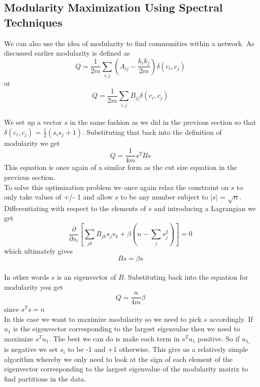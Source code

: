 \documentclass[12pt]{article}
\begin{document}
	\subsection{Modularity Maximization Using Spectral Techniques} 
	We can also use the idea of modularity to find communities within a network. As discussed earlier modularity is defined as 
	\begin{equation}
		Q = \frac{1}{2m} \sum_{i,j} \left( A_{ij} - \frac{k_i k_j}{2m} \right) \delta (c_i,c_j)
	\end{equation}
	or
	\begin{equation}
		Q = \frac{1}{2m} \sum_{i,j} B_{ij} \delta (c_i,c_j)
	\end{equation}
	\\
	We set up a vector $s$ in the same fashion as we did in the previous section so that $\delta (c_i,c_j)$ = $\frac{1}{2} (s_i s_j + 1)$. Substituting that back into the definition of modularity we get
	\begin{equation}
		Q = \frac{1}{4m} s^T B s
	\end{equation}
	This equation is once again of a similar form as the cut size equation in the previous section. 
	\\
	To solve this optimization problem we once again relax the constraint on $s$ to only take values of +/- 1 and allow $s$ to be any number subject to $|s|$ = $\sqrt{n}$. Differentiating with respect to the elements of $s$ and introducing a Lagrangian we get
	\begin{equation}
		\frac{\partial}{\partial s_i} 
			\left[ 
			\sum_{jk} B_{jk} s_j s_k 
			+ \beta \left( n - \sum_j s_j^2 \right)
			\right] = 0
	\end{equation}
	which ultimately gives
	\begin{equation}
		B s = \beta s
	\end{equation}
	\\
	In other words $s$ is an eigenvector of $B$. Substituting back into the equation for modularity you get
	\begin{equation}
		Q = \frac{n}{4m} \beta
	\end{equation}
	since $s^T s = n$
	\\
	
	In this case we want to maximize modularity so we need to pick $s$ accordingly. If $u_1$ is the eigenvector corresponding to the largest eigenvalue then we need to maximize $s^T u_1$. The best we can do is make each term in $s^T u_1$ positive. So if $u_{1_i}$ is negative we set $s_i$ to be -1 and +1 otherwise. This give us a relatively simple algorithm whereby we only need to look at the sign of each element of the eigenvector corresponding to the largest eigenvalue of the modularity matrix to find partitions in the data. 
	
\end{document}
